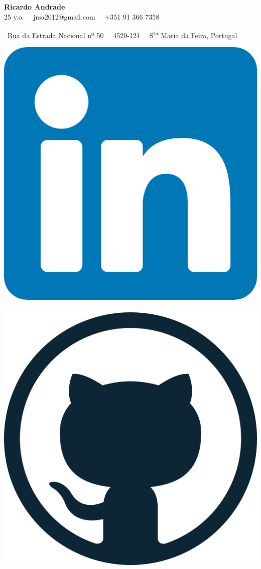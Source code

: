 \documentclass{mycv}
\begin{document}
\begin{center}
	{\LARGE\textbf{Ricardo Andrade}} \\
	\vspace{0.2cm}
	25 y.o.~\textbullet
	\ jrsa2012@gmail.com~\textbullet 
	\ +351 91 366 7358
	
	\ Rua da Estrada Nacional n\textsuperscript{\underline{o}} 50~\textbullet
	\ 4520-124~\textbullet
	\ S\textsuperscript{ta} Maria da Feira, Portugal
	
	\vspace{0.3cm}
	
	\href{https://www.linkedin.com/in/jrsa2012}{\includegraphics[scale=0.035]{figs/linkedin_logo.png}}
	\ \ \
	\href{https://github.com/jrsa2012}{\includegraphics[scale=0.02]{figs/github_logo.png}}

\end{center}
\end{document}
